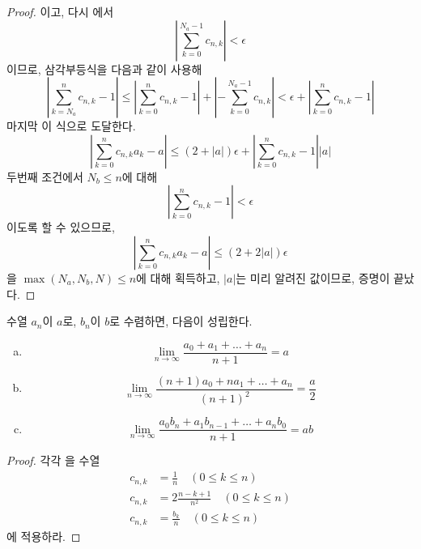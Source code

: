 \begin{proof}
    이고, 다시 에서 
    \begin{equation*}
        \left| \sum_{k = 0}^{N_a - 1} c_{n, k} \right| < \epsilon
    \end{equation*}
    이므로, 삼각부등식을 다음과 같이 사용해
    \begin{equation*}
        \left| \sum_{k = N_a}^n c_{n, k} - 1 \right| \leq \left| \sum_{k = 0}^n c_{n, k} - 1 \right| + \left| - \sum_{k = 0}^{N_a - 1} c_{n, k} \right| < \epsilon + \left| \sum_{k = 0}^n c_{n, k} - 1 \right|
    \end{equation*}
    마지막 이 식으로 도달한다.
    \begin{equation*}
        \left| \sum_{k = 0}^n c_{n, k} a_k  - a \right| \leq (2 + |a|)\epsilon + \left| \sum_{k = 0}^n c_{n, k} - 1 \right| |a|
    \end{equation*}
    두번째 조건에서 $N_b \leq n$에 대해 
    \begin{equation*}
        \left| \sum_{k = 0}^n c_{n, k} - 1 \right| < \epsilon
    \end{equation*}
    이도록 할 수 있으므로,
    \begin{equation*}
        \left| \sum_{k = 0}^n c_{n, k} a_k  - a \right| \leq (2 + 2|a|)\epsilon
    \end{equation*}
    을 $\max(N_a, N_b, N) \leq n$에 대해 획득하고, $|a|$는 미리 알려진 값이므로, 증명이 끝났다.
\end{proof}

\begin{corollary}
    수열 $a_n$이 $a$로, $b_n$이 $b$로 수렴하면, 다음이 성립한다.
    \begin{enumerate}[(a)]
        \item \begin{equation*}
            \lim_{n \to \infty} \frac{a_0 + a_1 + \dots + a_n}{n + 1} = a 
        \end{equation*}
        \item \begin{equation*}
            \lim_{n \to \infty} \frac{(n + 1)a_0 + n a_1 + \dots + a_n}{(n + 1)^2} = \frac{a}{2}
        \end{equation*}
        \item \begin{equation*}
            \lim_{n \to \infty} \frac{a_0 b_n + a_1 b_{n - 1} + \dots + a_n b_0}{n + 1} = ab
        \end{equation*}
    \end{enumerate}
\end{corollary}
\begin{proof}
    각각 을 수열 
    \begin{align*}
        c_{n, k} &= \frac{1}{n} \quad (0 \leq k \leq n) \\
        c_{n, k} &= 2\frac{n - k + 1}{n^2} \quad (0 \leq k \leq n)\\
        c_{n, k} &= \frac{b_k}{n} \quad (0 \leq k \leq n)
    \end{align*}
    에 적용하라.
\end{proof}


